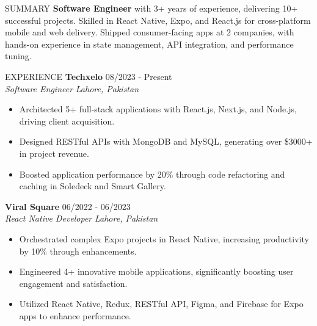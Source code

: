 \documentclass{resume}
\begin{document}
\begin{rSection}{SUMMARY}
\textbf{Software Engineer} with 3+ years of experience, delivering 10+ successful projects. Skilled in React Native, Expo, and React.js for cross-platform mobile and web delivery. Shipped consumer-facing apps at 2 companies, with hands-on experience in state management, API integration, and performance tuning.
\end{rSection}
\begin{rSection}{EXPERIENCE}
\textbf{Techxelo} \hfill 08/2023 - Present \\
\textit{Software Engineer}  \hfill \textit{Lahore, Pakistan}
\begin{itemize}
\itemsep -3pt {}
\item Architected 5+ full-stack applications with React.js, Next.js, and Node.js, driving client acquisition.
\item Designed RESTful APIs with MongoDB and MySQL, generating over \$3000+ in project revenue.
\item Boosted application performance by 20\% through code refactoring and caching in Soledeck and Smart Gallery.
\end{itemize}
\textbf{Viral Square} \hfill 06/2022 - 06/2023 \\
\textit{React Native Developer} \hfill \textit{Lahore, Pakistan}
\begin{itemize}
\itemsep -3pt {}
\item Orchestrated complex Expo projects in React Native, increasing productivity by 10\% through enhancements.
\item Engineered 4+ innovative mobile applications, significantly boosting user engagement and satisfaction.
\item Utilized React Native, Redux, RESTful API, Figma, and Firebase for Expo apps to enhance performance.
\end{itemize}
\end{rSection}
\end{document}

